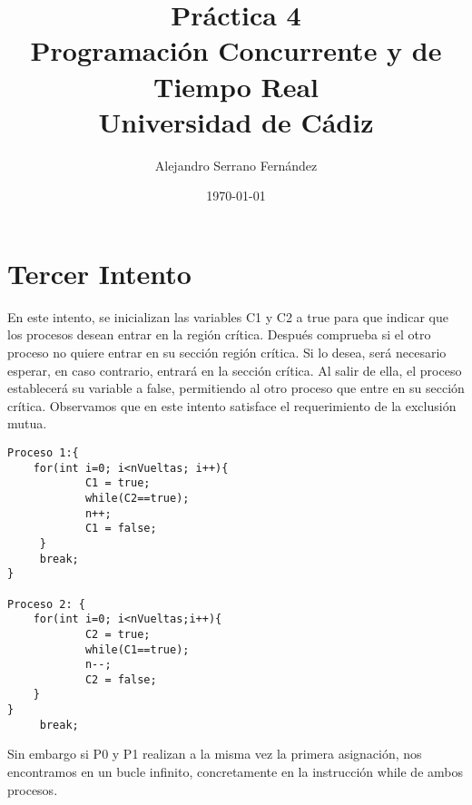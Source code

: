 \documentclass{article}
\title{Práctica 4 \\ Programación Concurrente y de Tiempo Real \\Universidad de Cádiz} %
\author{Alejandro Serrano Fernández} %
\date{\today} %
\begin{document}
\maketitle %



\section{Tercer Intento}
En este intento, se inicializan las variables C1 y C2 a true para que indicar que los procesos desean entrar en la región crítica. Después comprueba si el otro proceso no quiere entrar en su sección región crítica. Si lo desea, será necesario esperar, en caso contrario, entrará en la sección crítica. Al salir de ella, el proceso establecerá su variable a false, permitiendo al otro proceso que entre en su sección crítica.
\hfill \break
\hfill \break
Observamos que en este intento satisface el requerimiento de la exclusión mutua.

\begin{verbatim}
Proceso 1:{
	for(int i=0; i<nVueltas; i++){
	        C1 = true;
	        while(C2==true);	        	      
	        n++;
	        C1 = false;	        	      
     }
	 break;
}

Proceso 2: {
	for(int i=0; i<nVueltas;i++){
	        C2 = true;
	        while(C1==true);	        	      
	        n--;
	        C2 = false;
    }	        
}  
     break;
\end{verbatim}
\hfill \break
\hfill \break
Sin embargo si P0 y P1 realizan a la misma vez la primera asignación, nos encontramos en un bucle infinito, concretamente en la instrucción while de ambos procesos.



\end{document}
